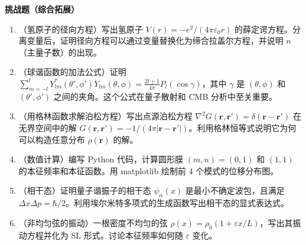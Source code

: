 \textbf{挑战题（综合拓展）}

\begin{enumerate}
\item[13.]（氢原子的径向方程）写出氢原子 $V(r)=-e^2/(4\pi\varepsilon_0 r)$ 的薛定谔方程。分离变量后，证明径向方程可以通过变量替换化为缔合拉盖尔方程，并说明 $n$（主量子数）的出现。
\item[14.]（球谐函数的加法公式）证明 $\sum_{m=-l}^l Y_{lm}^*(\theta',\phi')Y_{lm}(\theta,\phi) = \frac{2l+1}{4\pi}P_l(\cos\gamma)$，其中 $\gamma$ 是 $(\theta,\phi)$ 和 $(\theta',\phi')$ 之间的夹角。这个公式在量子散射和 CMB 分析中至关重要。
\item[15.]（用格林函数求解泊松方程）写出点源泊松方程 $\nabla^2 G(\mathbf{r},\mathbf{r}') = \delta(\mathbf{r}-\mathbf{r}')$ 在无界空间中的解 $G(\mathbf{r},\mathbf{r}') = -1/(4\pi|\mathbf{r}-\mathbf{r}'|)$。利用格林恒等式说明它为何可以构造任意分布 $\rho(\mathbf{r})$ 的解。
\item[16.]（数值计算）编写 Python 代码，计算圆形膜 $(m,n)=(0,1)$ 和 $(1,1)$ 的本征频率和本征函数。用 matplotlib 绘制前 4 个模式的位移分布图。
\item[17.]（相干态）证明量子谐振子的相干态 $\psi_\alpha(x)$ 是最小不确定波包，且满足 $\Delta x \Delta p = \hbar/2$。利用埃尔米特多项式的生成函数写出相干态的显式表达式。
\item[18.]（非均匀弦的振动）一根密度不均匀的弦 $\rho(x) = \rho_0(1 + \varepsilon x/L)$，写出其振动方程并化为 SL 形式。讨论本征频率如何随 $\varepsilon$ 变化。
\end{enumerate}
